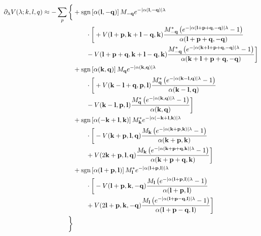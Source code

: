 \begin{align*}
	\partial_{\lambda} V(\lambda; k, l, q) \approx - \sum_{p} \bigg\{ &+\operatorname{sgn} \left[\alpha (\mathbf{l}, -\mathbf{q})\right] M_{-\mathbf{q}} e^{ - | \alpha (\mathbf{l},-\mathbf{q}) | \lambda }\\
		&\qquad\cdot\bigg[  + V(\mathbf{l}+\mathbf{p}, \mathbf{k}+\mathbf{l}-\mathbf{q}, \mathbf{k}) \frac{M_{-\mathbf{q}}^* \left(  e^{ - | \alpha (\mathbf{l}+\mathbf{p}+\mathbf{q},-\mathbf{q}) | \lambda } - 1 \right)}{\alpha (\mathbf{l}+\mathbf{p}+\mathbf{q}, -\mathbf{q})}\\
		&\qquad - V(\mathbf{l}+\mathbf{p}+\mathbf{q}, \mathbf{k}+\mathbf{l}-\mathbf{q}, \mathbf{k}) \frac{M_{-\mathbf{q}}^* \left(  e^{ - | \alpha (\mathbf{k}+\mathbf{l}+\mathbf{p}+\mathbf{q},-\mathbf{q}) | \lambda } - 1 \right)}{\alpha (\mathbf{k}+\mathbf{l}+\mathbf{p}+\mathbf{q}, -\mathbf{q})} \bigg]\\
	&+\operatorname{sgn} \left[\alpha (\mathbf{k}, \mathbf{q})\right] M_{\mathbf{q}} e^{ - | \alpha (\mathbf{k},\mathbf{q}) | \lambda }\\
		&\qquad\cdot\bigg[  + V(\mathbf{k}-\mathbf{l}+\mathbf{q}, \mathbf{p}, \mathbf{l}) \frac{M_{\mathbf{q}}^* \left(  e^{ - | \alpha (\mathbf{k}-\mathbf{l},\mathbf{q}) | \lambda } - 1 \right)}{\alpha (\mathbf{k}-\mathbf{l}, \mathbf{q})}\\
		&\qquad - V(\mathbf{k}-\mathbf{l}, \mathbf{p}, \mathbf{l}) \frac{M_{\mathbf{q}}^* \left(  e^{ - | \alpha (\mathbf{k},\mathbf{q}) | \lambda } - 1 \right)}{\alpha (\mathbf{k}, \mathbf{q})} \bigg]\\
	&+\operatorname{sgn} \left[\alpha (-\mathbf{k}+\mathbf{l}, \mathbf{k})\right] M_{\mathbf{k}}^* e^{ - | \alpha (-\mathbf{k}+\mathbf{l},\mathbf{k}) | \lambda }\\
		&\qquad\cdot\bigg[  - V(\mathbf{k}+\mathbf{p}, \mathbf{l}, \mathbf{q}) \frac{M_{\mathbf{k}} \left(  e^{ - | \alpha (\mathbf{k}+\mathbf{p},\mathbf{k}) | \lambda } - 1 \right) }{\alpha (\mathbf{k}+\mathbf{p}, \mathbf{k})}\\
		&\qquad + V(2\mathbf{k}+\mathbf{p}, \mathbf{l}, \mathbf{q}) \frac{M_{\mathbf{k}} \left(  e^{ - | \alpha (\mathbf{k}+\mathbf{p}+\mathbf{q},\mathbf{k}) | \lambda } - 1 \right)}{\alpha (\mathbf{k}+\mathbf{p}+\mathbf{q}, \mathbf{k})} \bigg]\\
	&+\operatorname{sgn} \left[\alpha (\mathbf{l}+\mathbf{p}, \mathbf{l})\right] M_{\mathbf{l}}^* e^{ - | \alpha (\mathbf{l}+\mathbf{p},\mathbf{l}) | \lambda }\\
		&\qquad\cdot\bigg[  - V(\mathbf{l}+\mathbf{p}, \mathbf{k}, -\mathbf{q}) \frac{M_{\mathbf{l}} \left(  e^{ - | \alpha (\mathbf{l}+\mathbf{p},\mathbf{l}) | \lambda } - 1 \right) }{\alpha (\mathbf{l}+\mathbf{p}, \mathbf{l})}\\
		&\qquad + V(2\mathbf{l}+\mathbf{p}, \mathbf{k}, -\mathbf{q}) \frac{M_{\mathbf{l}} \left(  e^{ - | \alpha (\mathbf{l}+\mathbf{p}-\mathbf{q},\mathbf{l}) | \lambda } - 1 \right)}{\alpha (\mathbf{l}+\mathbf{p}-\mathbf{q}, \mathbf{l})} \bigg]\\
	 \bigg\}
\end{align*}

